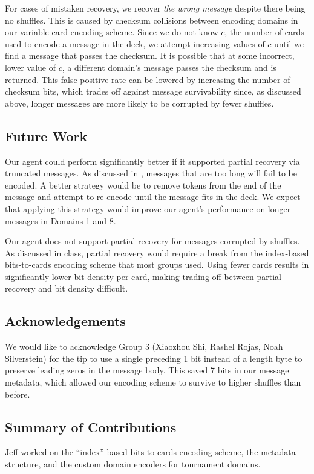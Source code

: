 \documentclass[titlepage]{article}
\begin{document}
For cases of mistaken recovery, we recover \textit{the wrong message} despite there being no shuffles. This is caused by checksum collisions between encoding domains in our variable-card encoding scheme. Since we do not know $c$, the number of cards used to encode a message in the deck, we attempt increasing values of $c$ until we find a message that passes the checksum. It is possible that at some incorrect, lower value of $c$, a different domain's message passes the checksum and is returned. This false positive rate can be lowered by increasing the number of checksum bits, which trades off against message survivability since, as discussed above, longer messages are more likely to be corrupted by fewer shuffles.

\subsection{Future Work} \label{future}
Our agent could perform significantly better if it supported partial recovery via truncated messages. As discussed in , messages that are too long will fail to be encoded. A better strategy would be to remove tokens from the end of the message and attempt to re-encode until the message fits in the deck. We expect that applying this strategy would improve our agent's performance on longer messages in Domains 1 and 8.

Our agent does not support partial recovery for messages corrupted by shuffles. As discussed in class, partial recovery would require a break from the index-based bits-to-cards encoding scheme that most groups used. Using fewer cards results in significantly lower bit density per-card, making trading off between partial recovery and bit density difficult.

\subsection{Acknowledgements}
We would like to acknowledge Group 3 (Xiaozhou Shi, Rashel Rojas, Noah Silverstein) for the tip to use a single preceding 1 bit instead of a length byte to preserve leading zeros in the message body. This saved 7 bits in our message metadata, which allowed our encoding scheme to survive to higher shuffles than before.

\subsection{Summary of Contributions}
Jeff worked on the ``index''-based bits-to-cards encoding scheme, the metadata structure, and the custom domain encoders for tournament domains.
\end{document}
